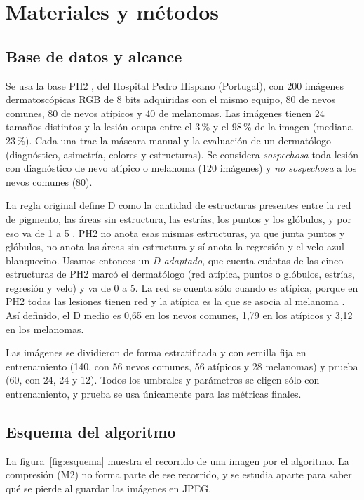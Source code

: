 \section{Materiales y métodos}
\label{sec:metodos}

\subsection{Base de datos y alcance}
\label{sec:base}

Se usa la base PH2 \parencite{mendonca2013}, del Hospital Pedro Hispano (Portugal), con 200 imágenes dermatoscópicas RGB de 8 bits adquiridas con el mismo equipo, 80 de nevos comunes, 80 de nevos atípicos y 40 de melanomas. Las imágenes tienen 24 tamaños distintos y la lesión ocupa entre el 3\,\% y el 98\,\% de la imagen (mediana 23\,\%). Cada una trae la máscara manual y la evaluación de un dermatólogo (diagnóstico, asimetría, colores y estructuras). Se considera \emph{sospechosa} toda lesión con diagnóstico de nevo atípico o melanoma (120 imágenes) y \emph{no sospechosa} a los nevos comunes (80).

La regla original define D como la cantidad de estructuras presentes entre la red de pigmento, las áreas sin estructura, las estrías, los puntos y los glóbulos, y por eso va de 1 a 5 \parencite{nachbar1994}. PH2 no anota esas mismas estructuras, ya que junta puntos y glóbulos, no anota las áreas sin estructura y sí anota la regresión y el velo azul-blanquecino. Usamos entonces un \emph{D adaptado}, que cuenta cuántas de las cinco estructuras de PH2 marcó el dermatólogo (red atípica, puntos o glóbulos, estrías, regresión y velo) y va de 0 a 5. La red se cuenta sólo cuando es atípica, porque en PH2 todas las lesiones tienen red y la atípica es la que se asocia al melanoma \parencite{argenziano2003}. Así definido, el D medio es 0,65 en los nevos comunes, 1,79 en los atípicos y 3,12 en los melanomas.

Las imágenes se dividieron de forma estratificada y con semilla fija en entrenamiento (140, con 56 nevos comunes, 56 atípicos y 28 melanomas) y prueba (60, con 24, 24 y 12). Todos los umbrales y parámetros se eligen sólo con entrenamiento, y prueba se usa únicamente para las métricas finales.

\subsection{Esquema del algoritmo}
\label{sec:esquema}
La figura~\ref{fig:esquema} muestra el recorrido de una imagen por el algoritmo. La compresión (M2) no forma parte de ese recorrido, y se estudia aparte para saber qué se pierde al guardar las imágenes en JPEG.

